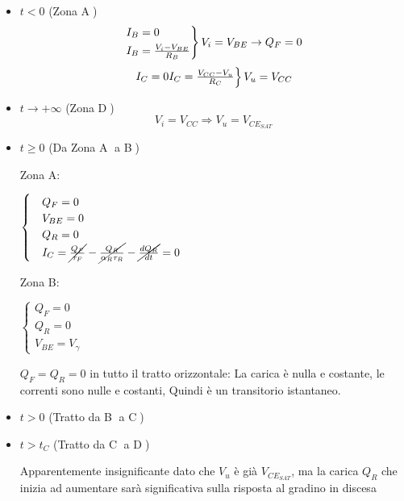 \documentclass{article}
\begin{document}
\begin{itemize}
    \item \underline{$ t < 0$} (Zona \textcircled{A})
        \[
            \begin{rcases}
                I_B = 0\\
                I_B = \frac{V_i - V_{BE}}{R_B}
            \end{rcases} V_i = V_{BE} \rightarrow Q_F = 0
        \]
        \[
            \begin{rcases}
                I_C = 0
                I_C = \frac{V_{CC} - V_u}{R_C}
            \end{rcases} V_u = V_{CC}
        \]
    \item \underline{$ t \to +\infty$} (Zona \textcircled{D})
        \[
            V_i = V_{CC} \Rightarrow V_u = V_{CE_{SAT}}
        \]
    \item \underline{$t \ge 0$} (Da Zona \textcircled{A} a \textcircled{B})

        \bigbreak%
        \begin{minipage}{0.45\textwidth}
            \begin{center}
                Zona A:
            \end{center}

           $
                \begin{cases}
                    &Q_F = 0\\
                    &V_{BE} = 0\\
                    &Q_R = 0\\
                    &I_C = \cancel{\frac{Q_F}{\tau_F}} - \cancel{\frac{Q_R}{\alpha_R \tau_R}} - \cancel{\frac{dQ_R}{dt}} = 0
                \end{cases}
           $

        \end{minipage}
        \begin{minipage}{0.45\textwidth}
            \begin{center}
                Zona B:
            \end{center}

           $
                \begin{cases}
                    Q_F = 0\\
                    Q_R  = 0\\
                    V_{BE} = V_\gamma
                \end{cases}
            $
        \end{minipage}

        $Q_F = Q_R = 0$ in tutto il tratto orizzontale: La carica è nulla e costante, le correnti sono nulle e costanti, Quindi è un transitorio istantaneo.
    \item \underline{$t > 0$} (Tratto da \textcircled{B} a \textcircled{C})
    \item \underline{$t > t_C$} (Tratto da \textcircled{C} a \textcircled{D})

        Apparentemente insignificante dato che $V_u$ è già $V_{CE_{SAT}}$, ma la carica $Q_R$ che inizia ad aumentare sarà significativa sulla risposta al gradino in discesa
\end{itemize}
\end{document}

